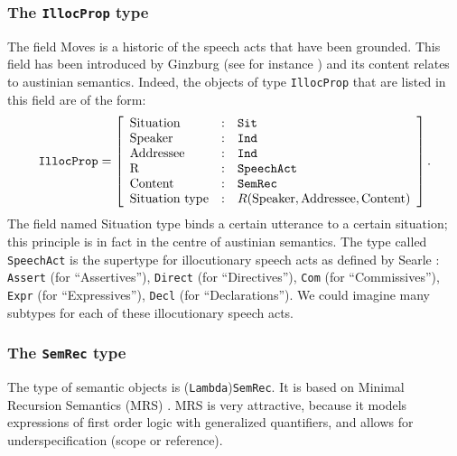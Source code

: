 \documentclass[11pt]{article}
\begin{document}
			\subsubsection{The \texttt{IllocProp} type}
				The field Moves is a historic of the speech acts that have been grounded. This field  has been introduced by Ginzburg (see for instance \cite{ginzburg2020}) and its content relates to austinian semantics. Indeed, the objects of type \texttt{IllocProp} that are listed in this field are of the form:
				\begin{equation*}
					\texttt{IllocProp} = \left[
					\begin{array}{l l l}
					\mbox{Situation} &:& \texttt{Sit} \\
					\mbox{Speaker} &:& \texttt{Ind} \\
					\mbox{Addressee} &:& \texttt{Ind} \\
					\mbox{R} &:& \texttt{SpeechAct} \\ 
					\mbox{Content} &:& \texttt{SemRec} \\
					\mbox{Situation type} &:& R(\mbox{Speaker}, \mbox{Addressee}, \mbox{Content}) \\
					\end{array}
					\right].
				\end{equation*}
				The field named Situation type binds a certain utterance to a certain situation; this principle is in fact in the centre of austinian semantics. The type called \texttt{SpeechAct} is the supertype for illocutionary speech acts as defined by Searle : \texttt{Assert} (for ``Assertives''), \texttt{Direct} (for ``Directives''), \texttt{Com} (for ``Commissives''), \texttt{Expr} (for ``Expressives''), \texttt{Decl} (for ``Declarations''). We could imagine many subtypes for each of these illocutionary speech acts.
				

			\subsubsection{The \texttt{SemRec} type}
				The type of semantic objects is (\texttt{Lambda})\texttt{SemRec}. It is based on Minimal Recursion Semantics (MRS) \cite{copestake2005}. MRS is very attractive, because it models expressions of first order logic with generalized quantifiers, and allows for underspecification (scope or reference).
				
\end{document}
